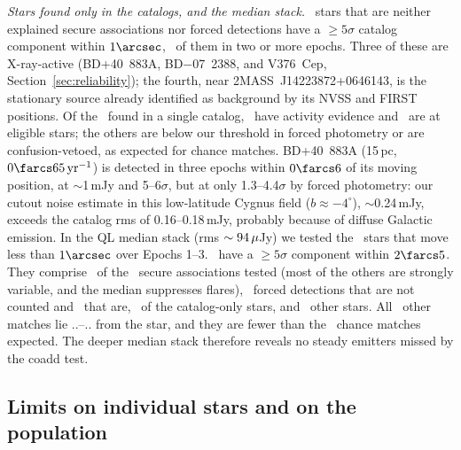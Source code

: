 \documentclass[linenumbers]{aastex702}
\makeatletter
\newcommand{\asec}[1]{\expandafter\asec@i#1..\@nil}
\def\asec@i#1.#2.#3\@nil{\ifx\relax#2\relax#1\arcsec\else#1\farcs#2\fi}
\makeatother
\begin{document}
\emph{Stars found only in the catalogs, and the median stack.} \XcCatOnlyN\ stars that are neither explained secure associations nor forced detections have a $\ge5\sigma$ catalog component within $1\arcsec$, \XcCatOnlyMulti\ of them in two or more epochs. Three of these are X-ray-active (BD+40~883A, BD$-$07~2388, and V376~Cep, Section~\ref{sec:reliability}); the fourth, near 2MASS~J14223872+0646143, is the stationary source already identified as background by its NVSS and FIRST positions. Of the \NCatOnlySingle\ found in a single catalog, \NCatOnlySingleAct\ have activity evidence and \NCatOnlySingleElig\ are at eligible stars; the others are below our threshold in forced photometry or are confusion-vetoed, as expected for chance matches. BD+40~883A (15\,pc, $0\farcs65\,{\rm yr}^{-1}$) is detected in three epochs within $0\farcs6$ of its moving position, at $\sim$1\,mJy and 5--6$\sigma$, but at only 1.3--4.4$\sigma$ by forced photometry: our cutout noise estimate in this low-latitude Cygnus field ($b\approx-4^\circ$), $\sim$0.24\,mJy, exceeds the catalog rms of 0.16--0.18\,mJy, probably because of diffuse Galactic emission. In the QL median stack (rms $\sim94\,\mu$Jy) we tested the \XcMedN\ stars that move less than $1\arcsec$ over Epochs 1--3. \XcMedDet\ have a $\ge5\sigma$ component within $2\farcs5$. They comprise \XcMedSecure\ of the \XcMedSecureTested\ secure associations tested (most of the others are strongly variable, and the median suppresses flares), \XcMedExplained\ forced detections that are not counted and \XcMedUnexplained\ that are, \XcMedCatonly\ of the catalog-only stars, and \XcMedNone\ other stars. All \XcMedNone\ other matches lie \asec{\XcMedNoneSepMin}--\asec{\XcMedNoneSepMax} from the star, and they are fewer than the \XcMedChance\ chance matches expected. The deeper median stack therefore reveals no steady emitters missed by the coadd test.

\subsection{Limits on individual stars and on the population} \label{sec:limits}
\end{document}
